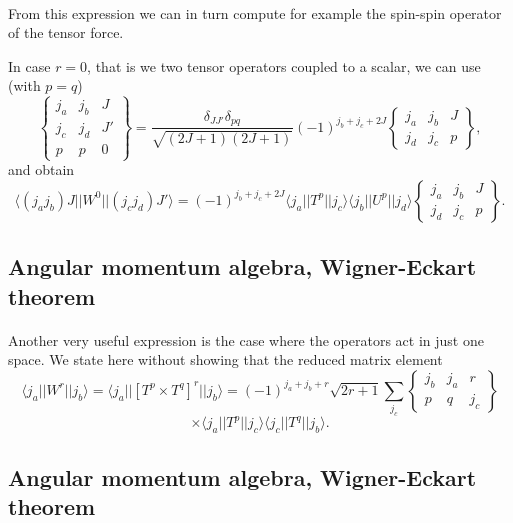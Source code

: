 \documentclass[%
twoside,                 %
final,                   %
10pt]{article}
\begin{document}
\paragraph{}
From this expression we can in turn compute for example the spin-spin operator of the tensor force.


In case $r=0$, that is we two tensor operators coupled to a scalar, we can use (with $p=q$) 
\[
\left\{\begin{array}{ccc} j_a & j_b& J \\ j_c & j_d & J' \\ p &p & 0\end{array}\right\}=\frac{\delta_{JJ'} \delta_{pq}}{\sqrt{(2J+1)(2J+1)}} (-1)^{j_b+j_c+2J} \begin{Bmatrix} j_a & j_b & J\\ j_d & j_c & p \end{Bmatrix},
\]
and obtain
\[
\langle (j_aj_b)J||W^{0}||(j_cj_d)J'\rangle=(-1)^{j_b+j_c+2J}\langle j_a||T^p||j_c\rangle\langle j_b||U^p||j_d\rangle \begin{Bmatrix} j_a & j_b & J\\ j_d & j_c & p \end{Bmatrix}.
\]


\subsection{Angular momentum algebra, Wigner-Eckart theorem}

\paragraph{}
Another very useful expression is the case where the operators act in just one space. We state here without 
showing that the reduced matrix element
\[
\langle j_a||W^{r}||j_b\rangle=\langle j_a||\left[T^p\times T^q\right]^{r}||j_b\rangle= (-1)^{j_a+j_b+r}\sqrt{2r+1} \sum_{j_c}\begin{Bmatrix} j_b & j_a & r\\ p & q & j_c \end{Bmatrix}
\]
\[
\times \langle j_a||T^p||j_c\rangle \langle j_c||T^q||j_b\rangle.
\]



\subsection{Angular momentum algebra, Wigner-Eckart theorem}
\end{document}
